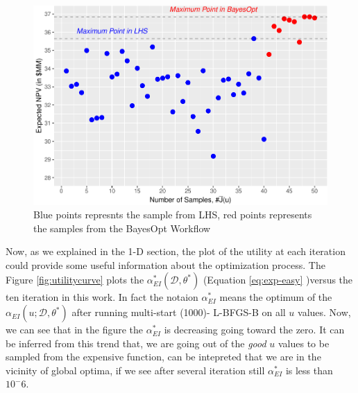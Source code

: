 \documentclass[]{elsarticle} %
\begin{document}
\begin{figure}

{\centering \includegraphics[width=468px]{0_Paper1_main_files/figure-latex/lhsbayesop-1} 

}

\caption{Blue points represnts the sample from LHS, red points represents the samples from the BayesOpt Workflow}\label{fig:lhsbayesop}
\end{figure}

Now, as we explained in the 1-D section, the plot of the utility at each iteration could provide some useful information about the optimization process. The Figure \ref{fig:utilitycurve} plots the \(\alpha_{EI}^*(\mathcal{D}, \theta^*)\) (Equation \eqref{eq:exp-easy} )versus the ten iteration in this work. In fact the notaion \(\alpha_{EI}^*\) means the optimum of the \(\alpha_{EI}(u;\mathcal{D},\theta^*)\) after running multi-start (1000)- L-BFGS-B on all \(u\) values. Now, we can see that in the figure the \(\alpha_{EI}^*\) is decreasing going toward the zero. It can be inferred from this trend that, we are going out of the \emph{good} \(u\) values to be sampled from the expensive function, can be intepreted that we are in the vicinity of global optima, if we see after several iteration still \(\alpha_{EI}^*\) is less than \(10^-6\).
\end{document}
